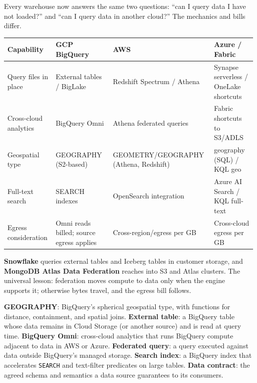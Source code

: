 \begin{crosscloud}
Every warehouse now answers the same two questions: ``can I query data I have not loaded?'' and ``can I query data in another cloud?'' The mechanics and bills differ.

\vspace{2mm}
{\footnotesize
\begin{tabular}{@{}p{2.8cm}p{3.0cm}p{3.0cm}p{3.0cm}@{}} \\
\toprule
\textbf{Capability} & \textbf{GCP BigQuery} & \textbf{AWS} & \textbf{Azure / Fabric} \\
\midrule
Query files in place & External tables / BigLake & Redshift Spectrum / Athena & Synapse serverless / OneLake shortcuts \\
Cross-cloud analytics & BigQuery Omni & Athena federated queries & Fabric shortcuts to S3/ADLS \\
Geospatial type & GEOGRAPHY (S2-based) & GEOMETRY/GEOGRAPHY (Athena, Redshift) & geography (SQL) / KQL geo \\
Full-text search & SEARCH indexes & OpenSearch integration & Azure AI Search / KQL full-text \\
Egress consideration & Omni reads billed; source egress applies & Cross-region/egress per GB & Cross-cloud egress per GB \\
\bottomrule
\end{tabular}}

\vspace{1mm}
\textbf{Snowflake} queries external tables and Iceberg tables in customer storage, and \textbf{MongoDB Atlas Data Federation} reaches into S3 and Atlas clusters. The universal lesson: federation moves compute to data only when the engine supports it; otherwise bytes travel, and the egress bill follows.
\end{crosscloud}

\begin{keyterms}
\textbf{GEOGRAPHY}: BigQuery's spherical geospatial type, with functions for distance, containment, and spatial joins.
\textbf{External table}: a BigQuery table whose data remains in Cloud Storage (or another source) and is read at query time.
\textbf{BigQuery Omni}: cross-cloud analytics that runs BigQuery compute adjacent to data in AWS or Azure.
\textbf{Federated query}: a query executed against data outside BigQuery's managed storage.
\textbf{Search index}: a BigQuery index that accelerates \texttt{SEARCH} and text-filter predicates on large tables.
\textbf{Data contract}: the agreed schema and semantics a data source guarantees to its consumers.
\end{keyterms}

